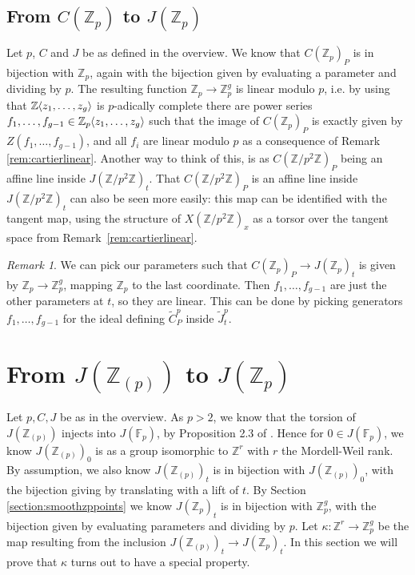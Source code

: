 \documentclass[12pt]{article}
\newcommand{\Z}{\mathbb{Z}}
\newcommand{\F}{\mathbb{F}}
\renewcommand{\angle}[1]{\hspace{-2pt}\left\langle #1 \right\rangle}
\theoremstyle{plain}
\theoremstyle{definition}
\theoremstyle{remark}
\newtheorem{rem}[thm]{Remark} %
\begin{document}
\subsection{From \texorpdfstring{$C(\Z_p)$}{C(Z\_p)} to \texorpdfstring{$J(\Z_p)$}{J(Z\_p)}}
\label{subsection:czptojzp}
Let $p$, $C$ and $J$ be as defined in the overview. We know that $C(\Z_p)_P$ is in bijection with $\Z_p$, again with the bijection given by evaluating a parameter and dividing by $p$. The resulting function $\Z_p \to \Z_p^g$ is linear modulo $p$, i.e. by using that $\Z\angle{z_1,\dots,z_g}$ is $p$-adically complete there are power series $f_1,\dots,f_{g-1} \in \Z_p\angle{z_1,\dots,z_g}$ such that the image of $C(\Z_p)_P$ is exactly given by $Z(f_1,\dots,f_{g-1})$, and all $f_i$ are linear modulo $p$ as a consequence of Remark \ref{rem:cartierlinear}. Another way to think of this, is as $C(\Z/p^2\Z)_P$ being an affine line inside $J(\Z/p^2\Z)_t$. That $C(\Z/p^2\Z)_P$ is an affine line inside $J(\Z/p^2\Z)_t$ can also be seen more easily: this map can be identified with the tangent map, using the structure of $X(\Z/p^2\Z)_x$ as a torsor over the tangent space from Remark~\ref{rem:cartierlinear}.

\begin{rem}
\label{rem:fislinear}
We can pick our parameters such that $C(\Z_p)_P \to J(\Z_p)_t$ is given by $\Z_p \to \Z_p^g$, mapping $\Z_p$ to the last coordinate. Then $f_1,\dots,f_{g-1}$ are just the other parameters at $t$, so they are linear. This can be done by picking generators $f_1,\dots,f_{g-1}$ for the ideal defining $\widetilde{C}_P^p$ inside $\widetilde{J}_t^p$.
\end{rem}

\section{From \texorpdfstring{$J(\Z_{(p)})$}{J(Z\_{(p)})} to \texorpdfstring{$J(\Z_p)$}{J(Z\_p)}}
\label{section:kappa}
Let $p,C,J$ be as in the overview. As $p > 2$, we know that the torsion of $J(\Z_{(p)})$ injects into $J(\F_p)$, by Proposition 2.3 of \cite{pierre2000}. Hence for $0 \in J(\F_p)$, we know $J(\Z_{(p)})_0$ is as a group isomorphic to $\Z^r$ with $r$ the Mordell-Weil rank. By assumption, we also know $J(\Z_{(p)})_t$ is in bijection with $J(\Z_{(p)})_0$, with the bijection giving by translating with a lift of $t$. By Section \ref{section:smoothzppoints} we know $J(\Z_p)_t$ is in bijection with $\Z_p^{g}$, with the bijection given by evaluating parameters and dividing by $p$. Let $\kappa: \Z^r \to \Z_p^g$ be the map resulting from the inclusion $J(\Z_{(p)})_t \to J(\Z_p)_t$. In this section we will prove that $\kappa$ turns out to have a special property.
\end{document}
